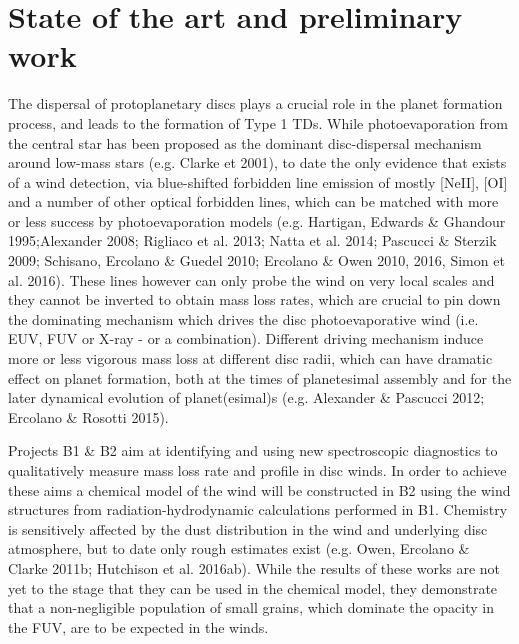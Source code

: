 \documentclass[10pt,fleqn,twoside]{article}
\newcommand{\Tcol}{\color{blue}}
\begin{document}
\section{\Tcol State of the art and preliminary work}
\renewcommand{\leftmark}{\sc State of the Art and preliminary work}

The dispersal of protoplanetary discs plays a crucial role in the
planet formation process, and leads to the formation of Type
1 TDs. While photoevaporation from the central star has been proposed
as the dominant disc-dispersal mechanism around low-mass stars
(e.g. Clarke et 2001), to date the only evidence that exists of a
wind detection, via blue-shifted forbidden line emission of mostly
[NeII], [OI] and a number of other optical forbidden lines, which can
be matched with more or less success by photoevaporation models
(e.g. Hartigan, Edwards \& Ghandour 1995;Alexander 2008; 
Rigliaco et al. 2013; Natta et al. 2014; Pascucci \& Sterzik 2009; Schisano, Ercolano \& Guedel 2010; Ercolano
\& Owen 2010, 2016, Simon et al. 2016). These lines however  can only probe the wind on very local
scales and they cannot be inverted to obtain mass loss rates, which
are crucial to pin down the dominating mechanism which drives the disc
photoevaporative wind
(i.e. EUV, FUV or X-ray - or a combination). Different driving
mechanism induce more or less vigorous mass loss at different disc
radii, which  can have dramatic effect on planet formation, both at
the times of planetesimal assembly and for the later dynamical
evolution of planet(esimal)s (e.g. Alexander \& Pascucci 2012;
Ercolano \& Rosotti 2015).   

Projects B1 \& B2 aim at identifying and using new spectroscopic
diagnostics to qualitatively measure mass loss rate and profile in disc 
winds. In order to achieve these aims a chemical model of the wind will
be constructed in B2 using the wind structures from
radiation-hydrodynamic calculations performed in B1. Chemistry is
sensitively affected by the dust distribution in the wind and
underlying disc atmosphere, but to date only rough estimates exist
(e.g. Owen, Ercolano \& Clarke 2011b; Hutchison et al. 2016ab). While
the results of these works are not yet to the stage that they can 
be used in the chemical model, they demonstrate
that a non-negligible population of small grains, which dominate the
opacity in the FUV, are to be expected in the winds. 
\end{document}
